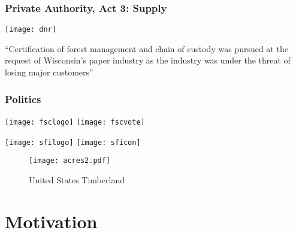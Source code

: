 \begin{frame}
\frametitle{Private Authority, Act 3: Supply}
\centering 
\texttt{[image: dnr]}

``Certification of forest management and chain of custody was pursued at the request of Wisconsin's paper industry as the industry was under the threat of losing major customers''
\end{frame}



\begin{frame}
\frametitle{Politics}
\texttt{[image: fsclogo]}   
\texttt{[image: fscvote]} \pause

\texttt{[image: sfilogo]}   
\texttt{[image: sficon]}
\end{frame}


\begin{frame}
\begin{figure}[h!]
\centering
\caption{United States Timberland}
\label{acres}
\centering
\texttt{[image: acres2.pdf]}
\centering
\footnotesize


\end{figure}
\end{frame}


\section{Motivation}



